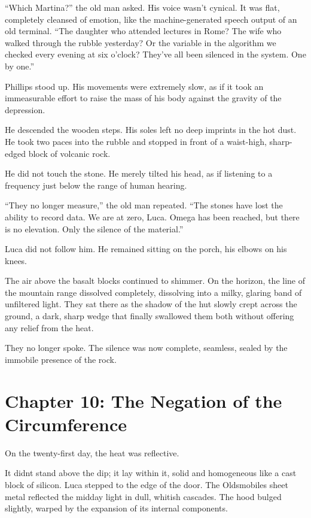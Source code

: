 \documentclass[
  ngerman,
]{article}
\begin{document}
``Which Martina?'' the old man asked. His voice wasn't cynical. It was
flat, completely cleansed of emotion, like the machine-generated speech
output of an old terminal. ``The daughter who attended lectures in Rome?
The wife who walked through the rubble yesterday? Or the variable in the
algorithm we checked every evening at six o'clock? They've all been
silenced in the system. One by one.''

Phillips stood up. His movements were extremely slow, as if it took an
immeasurable effort to raise the mass of his body against the gravity of
the depression.

He descended the wooden steps. His soles left no deep imprints in the
hot dust. He took two paces into the rubble and stopped in front of a
waist-high, sharp-edged block of volcanic rock.

He did not touch the stone. He merely tilted his head, as if listening
to a frequency just below the range of human hearing.

``They no longer measure,'' the old man repeated. ``The stones have lost
the ability to record data. We are at zero, Luca. Omega has been
reached, but there is no elevation. Only the silence of the material.''

Luca did not follow him. He remained sitting on the porch, his elbows on
his knees.

The air above the basalt blocks continued to shimmer. On the horizon,
the line of the mountain range dissolved completely, dissolving into a
milky, glaring band of unfiltered light. They sat there as the shadow of
the hut slowly crept across the ground, a dark, sharp wedge that finally
swallowed them both without offering any relief from the heat.

They no longer spoke. The silence was now complete, seamless, sealed by
the immobile presence of the rock.

\section{\texorpdfstring{\textbf{Chapter 10: The Negation of the
Circumference}}{Chapter 10: The Negation of the Circumference}}\label{chapter-10-the-negation-of-the-circumference}

On the twenty-first day, the heat was reflective.

It didn\textquotesingle t stand above the dip; it lay within it, solid
and homogeneous like a cast block of silicon. Luca stepped to the edge
of the door. The Oldsmobile\textquotesingle s sheet metal reflected the
midday light in dull, whitish cascades. The hood bulged slightly, warped
by the expansion of its internal components.
\end{document}
